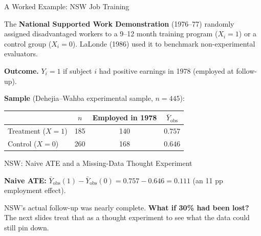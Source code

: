 \documentclass[handout, aspectratio=169]{beamer}
\numberwithin{equation}{section}
\begin{document}
\begin{frame}{A Worked Example: NSW Job Training}

The \textbf{National Supported Work Demonstration} (1976--77) randomly assigned disadvantaged workers to a 9--12 month training program ($X_i = 1$) or a control group ($X_i = 0$).  LaLonde (1986) used it to benchmark non-experimental evaluators.

\pause
\smallskip

\textbf{Outcome.} $Y_i = 1$ if subject $i$ had positive earnings in 1978 (employed at follow-up).

\pause
\smallskip

\textbf{Sample} (Dehejia--Wahba experimental sample, $n = 445$):
\begin{center}
\begin{tabular}{lccc}
\toprule
& $n$ & Employed in 1978 & $\bar{Y}_{\text{obs}}$ \\
\midrule
Treatment ($X=1$) & 185 & 140 & $0.757$ \\
Control ($X=0$)   & 260 & 168 & $0.646$ \\
\bottomrule
\end{tabular}
\end{center}
\end{frame}

\begin{frame}{NSW: Naive ATE and a Missing-Data Thought Experiment}

\textbf{Naive ATE:} $\bar{Y}_{\text{obs}}(1) - \bar{Y}_{\text{obs}}(0) = 0.757 - 0.646 = 0.111$ (an 11 pp employment effect).

\pause
\bigskip

NSW's actual follow-up was nearly complete.  \textbf{What if 30\% had been lost?}  The next slides treat that as a thought experiment to see what the data could still pin down.
\end{frame}
\end{document}
